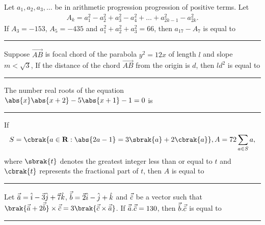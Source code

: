 \iffalse
\title{Assignment-4}
\author{EE24BTECH11049-Patnam Shariq Faraz Muhammed}
\section{integer}
\fi

%
    \item
    Let $a_1, a_2, a_3, \dots $ be in arithmetic progression progression of positive terms. Let
    \begin{align*}
        A_k = a_1^2 - a_2^2 + a_3^2 - a_4^2 + \dots + a_{2k-1}^2 -a_{2k}^2.
    \end{align*} 
    If $A_3 = -153$, $A_5 = -435$ and $a_1^2 + a_2^2 + a_3^2 = 66$, then $a_{17} - A_7$ is equal to \rule{1cm}{0.1pt}

    \hfill{}

    \item 
    Suppose $\vec{AB}$ is focal chord of the parabola $y^2 = 12x$ of length $l$ and slope $m < \sqrt{3}$, If the distance of the chord $\vec{AB}$ from the origin is $d$, then $ld^2$ is equal to \rule{1cm}{0.1pt}

    \hfill{}

    \item 
    The number real roots of the equation $\abs{x}\abs{x + 2} -  5\abs{x + 1} - 1 = 0$ is \rule{1cm}{0.1pt}

    \hfill{}

    \item 
    If 
    \begin{align*}
        S = \cbrak{a \in \mathbf{R} : \abs{2a - 1} = 3\sbrak{a} + 2\cbrak{a}}, A = 72\sum_{a \in S}a, 
    \end{align*}
    where $\sbrak{t}$ denotes the greatest integer less than or equal to $t$ and $\cbrak{t}$ represents the fractional part of $t$, then $A$ is equal to \rule{1cm}{0.1pt}

    \hfill{}

    \item 
    Let $\vec{\Bar{a}} = \hat{i} - \vec{3}\hat{j} + \vec{7}\hat{k}$, $\vec{\Bar{b}} = \vec{2}\hat{i} - \hat{j} + \hat{k}$ and $\vec{\Bar{c}}$ be a vector such that $\brak{\vec{\Bar{a}} + 2\vec{\Bar{b}}} \times \vec{\Bar{c}} = 3\brak{\vec{\Bar{c}} \times \vec{\Bar{a}}}$. If $\vec{\Bar{a}} . \vec{\Bar{c}} = 130$, then $\vec{\Bar{b}} . \vec{\Bar{c}}$ is equal to \rule{1cm}{0.1pt}


